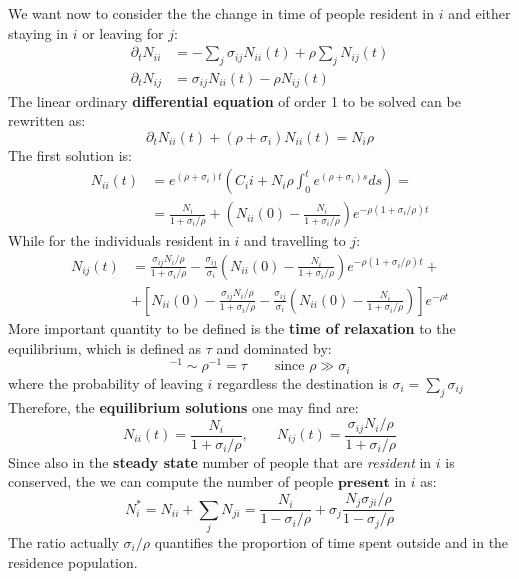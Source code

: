 \documentclass[../main/main.tex]{subfiles}
\begin{document}
We want now to consider the the change in time of people resident in $i$ and either staying in $i$ or leaving for $j$:
\begin{subequations}
\begin{align}
    \partial_t N_{ii} &= - \sum_{j} \sigma_{ij} N_{ii}(t) + \rho \sum_{j} N_{ij} (t)\\
    \partial_t N_{ij} &= \sigma_{ij} N_{ii}(t) - \rho N_{ij}(t)
\end{align}
\end{subequations}
The linear ordinary \textbf{differential equation} of order 1 to be solved can be rewritten as:
\begin{equation}
    \partial_t N_{ii} (t) + (\rho + \sigma_i) N_{ii}(t) = N_i \rho
\end{equation}
The first solution is:
\begin{equation}
\begin{split}
    N_{ii}(t) &= e^{(\rho + \sigma_i)t}\left( C_ii + N_i \rho \int_0^t e^{(\rho + \sigma_i)s}ds \right)=\\
     &= \frac{N_i}{1+\sigma_i/\rho} + \left( N_{ii}(0) - \frac{N_i}{1+\sigma_i/\rho} \right) e^{-\rho(1+\sigma_i/\rho)t}
\end{split}
\end{equation}
While for the individuals resident in $i$ and travelling to $j$:
\begin{equation}
\begin{split}
    N_{ij}(t) &= \frac{\sigma_{ij}N_i/\rho}{1+\sigma_i/\rho} - \frac{\sigma_{ij}}{\sigma_i} \left( N_{ii}(0) - \frac{N_i}{1+\sigma_i/\rho} \right) e^{-\rho(1+\sigma_i/\rho)t} +\\
    &+ \left[ N_{ii}(0) - \frac{\sigma_{ij}N_i/\rho}{1+\sigma_i/\rho} -\frac{\sigma_{ij}}{\sigma_i} \left( N_{ii}(0) - \frac{N_i}{1+\sigma_i/\rho} \right)\right] e^{-\rho t}
\end{split}
\end{equation}
More important quantity to be defined is the \textbf{time of relaxation} to the equilibrium, which is defined as $\tau$ and dominated by:
\begin{equation}
    [\rho(1+\sigma_i/\rho)]^{-1} \sim \rho^{-1} = \tau \qquad \text{since } \rho \gg \sigma_i
\end{equation}
where the probability of leaving $i$ regardless the destination is $\sigma_i = \sum_{j} \sigma_{ij}$
Therefore, the \textbf{equilibrium solutions} one may find are:
\begin{equation}
    N_{ii}(t) = \frac{N_i}{1+\sigma_i/\rho}, \qquad N_{ij}(t) = \frac{\sigma_{ij}N_i/\rho}{1+\sigma_i/\rho}
\end{equation}
Since also in the \textbf{steady state} number of people that are \textit{resident} in $i$ is conserved, the we can compute the number of people $\textbf{present}$ in $i$ as:
\begin{equation}
    N_i^* = N_{ii} + \sum_{j}N_{ji} = \frac{N_i}{1-\sigma_i/\rho} + \sigma_j \frac{N_j \sigma_{ji}/\rho}{1-\sigma_j/\rho}
    \label{eqn:N^*}
\end{equation}
The ratio actually $\sigma_i/\rho$ quantifies the proportion of time spent outside and in the residence population.
\end{document}
